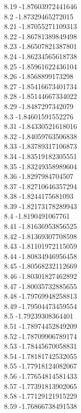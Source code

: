 {8.19	-1.87603972441646\\
8.2	-1.87329465272015\\
8.21	-1.87055271109313\\
8.22	-1.86781389849498\\
8.23	-1.86507821387801\\
8.24	-1.86234565618738\\
8.25	-1.85961622436104\\
8.26	-1.8568899173298\\
8.27	-1.85416673401734\\
8.28	-1.85144667334022\\
8.29	-1.8487297342079\\
8.3	-1.84601591552276\\
8.31	-1.84330521618016\\
8.32	-1.84059763506838\\
8.33	-1.83789317106873\\
8.34	-1.83519182305551\\
8.35	-1.83249358989604\\
8.36	-1.8297984704507\\
8.37	-1.82710646357294\\
8.38	-1.8244175681093\\
8.39	-1.82173178289943\\
8.4	-1.8190491067761\\
8.41	-1.81636953856525\\
8.42	-1.81369307708598\\
8.43	-1.81101972115059\\
8.44	-1.80834946956458\\
8.45	-1.80568232112669\\
8.46	-1.80301827462892\\
8.47	-1.80035732885655\\
8.48	-1.79769948258813\\
8.49	-1.79504473459554\\
8.5	-1.79239308364401\\
8.51	-1.78974452849209\\
8.52	-1.78709906789174\\
8.53	-1.78445670058831\\
8.54	-1.78181742532055\\
8.55	-1.77918124082067\\
8.56	-1.77654814581433\\
8.57	-1.77391813902065\\
8.58	-1.77129121915229\\
8.59	-1.76866738491538\\
}
